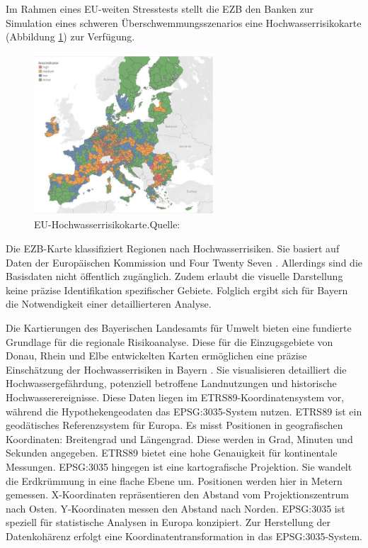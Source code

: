 Im Rahmen eines EU-weiten Stresstests stellt die \ac{EZB} den Banken zur Simulation eines schweren Überschwemmungsszenarios eine Hochwasserrisikokarte (Abbildung \ref{fig:euflut}) zur Verfügung.

\begin{figure}[htbp]
    \centering
    \includegraphics[width=0.6\textwidth]{figures/euflood.png} 
    \caption{EU-Hochwasserrisikokarte.Quelle: \textcite{ECB2022ClimateStressTest}}
    \label{fig:euflut}
\end{figure}
\FloatBarrier

Die \ac{EZB}-Karte klassifiziert Regionen nach Hochwasserrisiken. Sie basiert auf Daten der Europäischen Kommission und Four Twenty Seven \parencite{ECB2022ClimateStressTest}. Allerdings sind die Basisdaten nicht öffentlich zugänglich. Zudem erlaubt die visuelle Darstellung keine präzise Identifikation spezifischer Gebiete. Folglich ergibt sich für Bayern die Notwendigkeit einer detaillierteren Analyse.

Die Kartierungen des Bayerischen Landesamts für Umwelt bieten eine fundierte Grundlage für die regionale Risikoanalyse. Diese für die Einzugsgebiete von Donau, Rhein und Elbe entwickelten Karten ermöglichen eine präzise Einschätzung der Hochwasserrisiken in Bayern \parencite{LfU_Bayern}. Sie visualisieren detailliert die Hochwassergefährdung, potenziell betroffene Landnutzungen und historische Hochwasserereignisse.
Diese Daten liegen im ETRS89-Koordinatensystem vor, während die Hypothekengeodaten das EPSG:3035-System nutzen. ETRS89 ist ein geodätisches Referenzsystem für Europa. Es misst Positionen in geografischen Koordinaten: Breitengrad und Längengrad. Diese werden in Grad, Minuten und Sekunden angegeben. ETRS89 bietet eine hohe Genauigkeit für kontinentale Messungen.
EPSG:3035 hingegen ist eine kartografische Projektion. Sie wandelt die Erdkrümmung in eine flache Ebene um. Positionen werden hier in Metern gemessen. X-Koordinaten repräsentieren den Abstand vom Projektionszentrum nach Osten. Y-Koordinaten messen den Abstand nach Norden. EPSG:3035 ist speziell für statistische Analysen in Europa konzipiert.
Zur Herstellung der Datenkohärenz erfolgt eine Koordinatentransformation in das EPSG:3035-System. 

